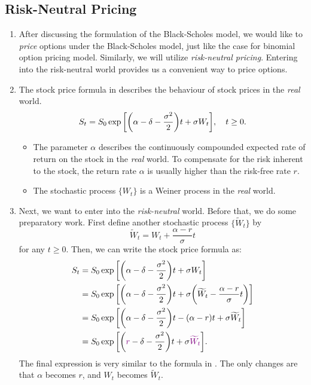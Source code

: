 \subsection{Risk-Neutral Pricing}
\begin{enumerate}
\item After discussing the formulation of the Black-Scholes model, we would
like to \emph{price} options under the Black-Scholes model, just like the case
for binomial option pricing model. Similarly, we will utilize
\emph{risk-neutral pricing}. Entering into the risk-neutral world provides us a
convenient way to price options.

\item The stock price formula in  describes
the behaviour of stock prices in the \emph{real} world.
\[
S_t=S_0\exp\qty[\qty(\alpha-\delta-\frac{\sigma^2}{2})t+\sigma W_t],\quad t\ge 0.
\]
\begin{itemize}
\item The parameter \(\alpha\) describes the continuously compounded expected
rate of return on the stock in the \emph{real} world. To compensate for the
risk inherent to the stock, the return rate \(\alpha\) is usually higher than
the risk-free rate \(r\).
\item The stochastic process \(\{W_t\}\) is a Weiner process in the \emph{real}
world.
\end{itemize}
\item Next, we want to enter into the \emph{risk-neutral} world. Before that,
we do some preparatory work. First define another stochastic process
\(\{\widetilde{W}_t\}\) by \[
 \widetilde{W}_t=W_t+\frac{\alpha-r}{\sigma}t
\]
for any \(t\ge 0\). Then, we can write the stock price formula as:
\begin{align*}
S_t&=S_0\exp\qty[\qty(\alpha-\delta-\frac{\sigma^2}{2})t+\sigma W_t] \\
&=S_0\exp\qty[\qty(\alpha-\delta-\frac{\sigma^2}{2})t+\sigma\qty(\widetilde{W}_t-\frac{\alpha-r}{\sigma}t)] \\
&=S_0\exp\qty[\qty(\alpha-\delta-\frac{\sigma^2}{2})t-(\alpha-r)t+\sigma\widetilde{W}_t] \\
&=S_0\exp\qty[\qty({\color{violet}r}-\delta-\frac{\sigma^2}{2})t+\sigma{\color{violet}\widetilde{W}_t}].
\end{align*}
The final expression is very similar to the formula in .
The only changes are that \(\alpha\) becomes \(r\), and \(W_t\) becomes
\(\widetilde{W}_t\).


\end{enumerate}
